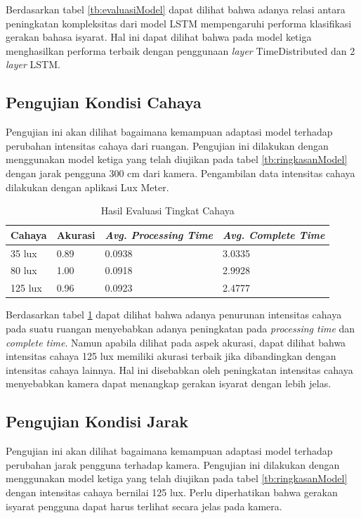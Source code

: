 Berdasarkan tabel \ref{tb:evaluasiModel} dapat dilihat bahwa adanya relasi antara peningkatan kompleksitas dari model LSTM mempengaruhi performa klasifikasi gerakan bahasa isyarat. Hal ini dapat dilihat bahwa pada model ketiga menghasilkan performa terbaik dengan penggunaan \emph{layer} TimeDistributed dan 2 \emph{layer} LSTM.

\subsection{Pengujian Kondisi Cahaya}
\label{sec:analisiscahaya}

Pengujian ini akan dilihat bagaimana kemampuan adaptasi model terhadap perubahan intensitas cahaya dari ruangan. Pengujian ini dilakukan dengan menggunakan model ketiga yang telah diujikan pada tabel \ref{tb:ringkasanModel} dengan jarak pengguna 300 cm dari kamera. Pengambilan data intensitas cahaya dilakukan dengan aplikasi Lux Meter.

\begin{table}[H]
  \caption{Hasil Evaluasi Tingkat Cahaya}
  \label{tb:evaluasiCahaya}
  \centering
  \begin{tabular}{llll}
    \hline
    \textbf{Cahaya} & \textbf{Akurasi} & \emph{\textbf{Avg. Processing Time}} & \emph{\textbf{Avg. Complete Time}} \\
    \hline
    35 lux & 0.89 & 0.0938 & 3.0335 \\
    80 lux & 1.00 & 0.0918 & 2.9928 \\
    125 lux & 0.96 & 0.0923 & 2.4777 \\
    \hline
  \end{tabular}
\end{table}

Berdasarkan tabel \ref{tb:evaluasiCahaya} dapat dilihat bahwa adanya penurunan intensitas cahaya pada suatu ruangan menyebabkan adanya peningkatan pada \emph{processing time} dan \emph{complete time}. Namun apabila dilihat pada aspek akurasi, dapat dilihat bahwa intensitas cahaya 125 lux memiliki akurasi terbaik jika dibandingkan dengan intensitas cahaya lainnya. Hal ini disebabkan oleh peningkatan intensitas cahaya menyebabkan kamera dapat menangkap gerakan isyarat dengan lebih jelas.


\subsection{Pengujian Kondisi Jarak}
\label{sec:analisisjarak}

Pengujian ini akan dilihat bagaimana kemampuan adaptasi model terhadap perubahan jarak pengguna terhadap kamera.  Pengujian ini dilakukan dengan menggunakan model ketiga yang telah diujikan pada tabel \ref{tb:ringkasanModel} dengan intensitas cahaya bernilai 125 lux. Perlu diperhatikan bahwa gerakan isyarat pengguna dapat harus terlihat secara jelas pada kamera. 

